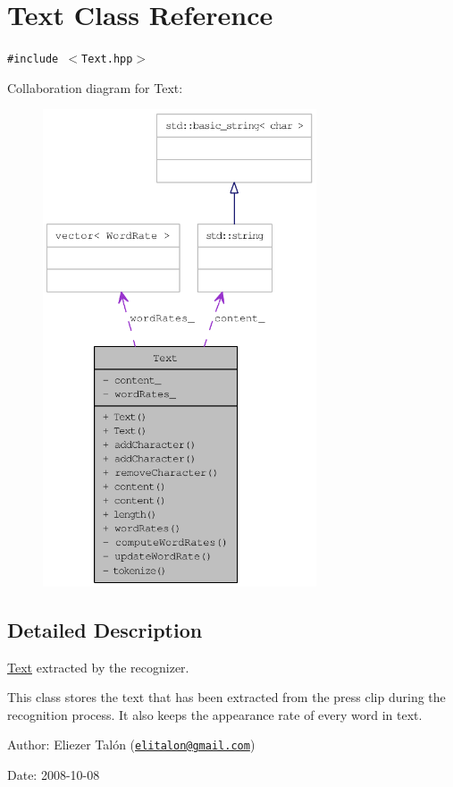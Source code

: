 \hypertarget{class_text}{
\section{Text Class Reference}
\label{class_text}
}
{\tt \#include $<$Text.hpp$>$}

Collaboration diagram for Text:\nopagebreak
\begin{figure}[H]
\begin{center}
\leavevmode
\includegraphics[height=400pt]{class_text__coll__graph}
\end{center}
\end{figure}


\subsection{Detailed Description}
\hyperlink{class_text}{Text} extracted by the recognizer. 

This class stores the text that has been extracted from the press clip during the recognition process. It also keeps the appearance rate of every word in text.

\begin{Desc}
\item[Author:]Eliezer Talón (\href{mailto:elitalon@gmail.com}{\tt elitalon@gmail.com}) \end{Desc}
\begin{Desc}
\item[Date:]2008-10-08 \end{Desc}


